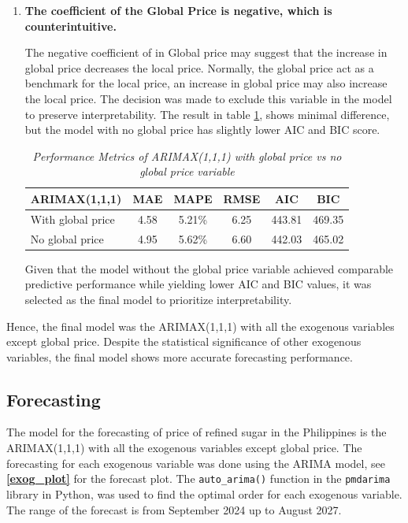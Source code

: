 \documentclass[11pt]{article}
\begin{document}
\begin{enumerate}
    \item \textbf{The coefficient of the Global Price is negative, which is counterintuitive.}

    The negative coefficient of in Global price may suggest that the increase in global price decreases the local price. Normally, the global price act as a benchmark for the local price, an increase in global price may also increase the local price. The decision was made to exclude this variable in the model to preserve interpretability. The result in table \ref{noglobal}, shows minimal difference, but the model with no global price has slightly lower AIC and BIC score. 
    
       \begin{table}[H]
        \caption{\textit{Performance Metrics of ARIMAX(1,1,1) with global price vs no global price variable}}
        \label{noglobal}
        \centering
        \begin{tabular}{lccccc}
            \toprule
            ARIMAX(1,1,1) & MAE & MAPE & RMSE & AIC & BIC \\
            \midrule
            With global price & 4.58 & 5.21\% & 6.25 & 443.81 & 469.35 \\
            No global price  & 4.95 & 5.62\% & 6.60 & 442.03 & 465.02 \\
            \bottomrule
        \end{tabular}
    \end{table}
     Given that the model without the global price variable achieved comparable predictive performance while yielding lower AIC and BIC values, it was selected as the final model to prioritize interpretability.
\end{enumerate}

Hence, the final model was the ARIMAX(1,1,1) with all the exogenous variables except global price. Despite the statistical significance of other exogenous variables, the final model shows more accurate forecasting performance.  

\subsection{Forecasting}

The model for the forecasting of price of refined sugar in the Philippines is the ARIMAX(1,1,1) with all the exogenous variables except global price. The forecasting for each exogenous variable was done using the ARIMA model, see \textbf{\ref{exog_plot}} for the forecast plot. The \texttt{auto\_arima()} function in the \texttt{pmdarima} library in Python, was used to find the optimal order for each exogenous variable. The range of the forecast is from September 2024 up to August 2027. 
\end{document}
